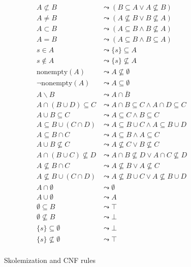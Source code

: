 \documentclass{article}
\newcommand{\compl}[1]{\ensuremath{\overline{#1}}}
\begin{document}
\begin{figure}[htbp]
\begin{center}
\begin{align*}
A \not\subset B &\leadsto (B \subseteq A \lor A \not\subseteq B) \\
A \not= B       &\leadsto (A \not\subseteq B \lor B \not\subseteq A) \\
A \subset B     &\leadsto (A \subseteq B \land B \not\subseteq A) \\
A = B           &\leadsto (A \subseteq B \land B \subseteq A) \\
s \in A         &\leadsto \{ s \} \subseteq A \\
s \not\in A     &\leadsto \{ s \} \not\subseteq A \\
\text{nonempty}(A)          &\leadsto A \not\subseteq \emptyset \\
\lnot \text{nonempty}(A)    &\leadsto A \subseteq \emptyset \\
A \backslash B
    & \leadsto A \cap \compl{B} \\
A \cap (B \cup D) \subseteq C
    & \leadsto A \cap B \subseteq C \land A \cap D \subseteq C \\
A \cup B \subseteq C
    & \leadsto A \subseteq C \land B \subseteq C \\
A \subseteq B \cup (C \cap D)
    & \leadsto A \subseteq B \cup C \land A \subseteq B \cup D \\
A \subseteq B \cap C
    & \leadsto A \subseteq B \land A \subseteq C \\
A \cup B \not\subseteq C
    & \leadsto A \not\subseteq C \lor B \not\subseteq C \\
A \cap (B \cup C) \not\subseteq D
    & \leadsto A \cap B \not\subseteq D \lor A \cap C \not\subseteq D \\
A \not\subseteq B \cap C
    & \leadsto A \not\subseteq B \lor A \not\subseteq C \\
A \not\subseteq B \cup (C \cap D)
    & \leadsto A \not\subseteq B \cup C \lor A \not\subseteq B \cup D \\
A \cap \emptyset
    & \leadsto \emptyset \\
A \cup \emptyset
    & \leadsto A \\
\emptyset \subseteq B
    & \leadsto \top \\
\emptyset \not\subseteq B
    & \leadsto \bot \\
\{ s \} \subseteq \emptyset
    & \leadsto \bot \\
\{ s \} \not\subseteq \emptyset
    & \leadsto \top \\
\end{align*}
\caption{Skolemization and CNF rules}
\label{fig:skolem}
\end{center}
\end{figure}
\end{document}
